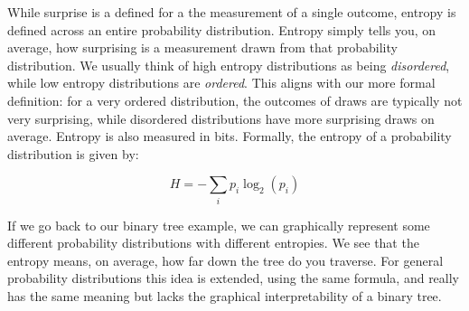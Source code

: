 \documentclass{article}
\begin{document}
While surprise is a defined for a the measurement of a single outcome, entropy is defined across an entire probability distribution. Entropy simply tells you, on average, how surprising is a measurement drawn from that probability distribution. We usually think of high entropy distributions as being \textit{disordered}, while low entropy distributions are \textit{ordered}. This aligns with our more formal definition: for a very ordered distribution, the outcomes of draws are typically not very surprising, while disordered distributions have more surprising draws on average. Entropy is also measured in bits. Formally, the entropy of a probability distribution is given by:

\begin{equation*}
    H = -\sum_i p_i \log_2(p_i)
\end{equation*}

If we go back to our binary tree example, we can graphically represent some different probability distributions with different entropies. We see that the entropy means, on average, how far down the tree do you traverse. For general probability distributions this idea is extended, using the same formula, and really has the same meaning but lacks the graphical interpretability of a binary tree.
\end{document}
